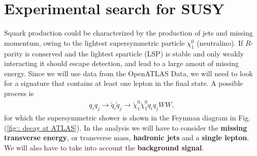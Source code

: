 \documentclass[11pt]{article}
\begin{document}
\section{Experimental search for SUSY}
\begin{flushleft}
Squark production could be characterized by the production of jets and missing momentum, owing to the lightest supersymmetric particle $\chi_1^0$ (neutralino). If $R$-parity is conserved and the lightest sparticle (LSP) is stable and only weakly interacting it should escape detection, and lead to a large amout of missing energy. Since we will use data from the OpenATLAS Data, we will need to look for a signature that contains at least one lepton in the final state. A possible process is 
\begin{align*}
q_iq_j \rightarrow \tilde{q}_i \tilde{q}_j \rightarrow \tilde{\chi}_1^0 \tilde{\chi}_1^0 q_i q_j WW,
\end{align*}
for which the supersymmetric shower is shown in the Feynman diagram in Fig. (\ref{fig:: decay at ATLAS}). In the analysis we will have to consider the \textbf{missing transverse energy}, or transverse mass, \textbf{hadronic jets} and a \textbf{single lepton}. We will also have to take into account the \textbf{background signal}.
\begin{figure}[H]
\centering
{}
\end{figure}
\end{flushleft}
\end{document}
